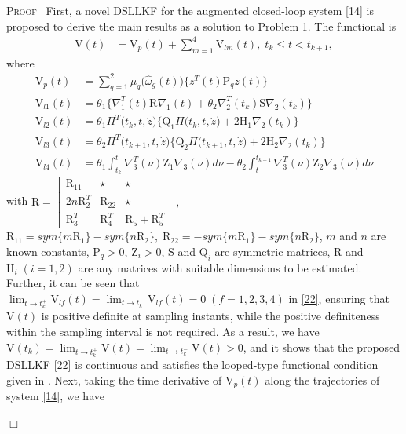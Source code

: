 \documentclass[preprint,11pt]{elsarticle}
\newenvironment{proof}{\noindent \textsc{Proof}\ }{\mbox{}\hfill $\Box$\\}
\begin{document}
\begin{proof}
First, a novel DSLLKF for the augmented closed-loop system \eqref{14} is proposed to derive the main results as a solution to Problem 1. The functional is
\begin{align}\label{22}
\mathrm{V}(t)&=\mathrm{V}_p(t)+\sum^4_{m=1}\mathrm{V}_{lm}(t),\;t_k\leq t<t_{k+1},
\end{align}
where\vspace{-0.3cm}
\begin{align*}
\mathrm{V}_p(t)&=\sum^{2}_{q=1}\mu_q\big( \hat{\omega}_g(t) \big)\big\{z^T(t)\mathrm{P}_qz(t)\big\}\\
\mathrm{V}_{l1}(t)&=\theta_1\Big\{\nabla^T_1(t)\mathrm{R}\nabla_1(t)+\theta_2\nabla^T_2(t_k)\mathrm{S}\nabla_2(t_k)\Big\}\\
\mathrm{V}_{l2}(t)&=\theta_1\Pi^T\big(t_k,t,\dot{z}\big)\Big\{ \mathrm{Q}_1\Pi\big(t_k,t,\dot{z}\big)+2\mathrm{H}_1 \nabla_2(t_k)\Big\}\\
\mathrm{V}_{l3}(t)&=\theta_2\Pi^T\big(t_{k+1},t,\dot{z}\big)\Big\{ \mathrm{Q}_2\Pi\big(t_{k+1},t,\dot{z}\big)+2\mathrm{H}_2 \nabla_2(t_k)\Big\}\\
\mathrm{V}_{l4}(t)&=\theta_1\int^t_{t_k}\nabla^T_3(\nu)\mathrm{Z}_1\nabla_3(\nu)d\nu
-\theta_2\int^{t_{k+1}}_{t}\nabla^T_3(\nu)\mathrm{Z}_2\nabla_3(\nu)d\nu
\end{align*}
with
$\mathrm{R}=
\begin{bmatrix}
\mathrm{R}_{11}  &   \star&  \star\\
2n\mathrm{R}^T_{2}& \mathrm{R}_{22} &  \star\\
\mathrm{R}^T_{3} & \mathrm{R}^T_{4}& \mathrm{R}_{5}+\mathrm{R}^T_{5}
\end{bmatrix},$
$\mathrm{R}_{11}=sym\{m\mathrm{R}_1\}-sym\{n\mathrm{R}_2\},\;
\mathrm{R}_{22}=-sym\{m\mathrm{R}_1\}-sym\{n\mathrm{R}_2\}$, $m$ and $n$ are known constants, $\mathrm{P}_q>0$, $\mathrm{Z}_i>0$, $\mathrm{S}$ and $\mathrm{Q}_i$ are symmetric matrices, $\mathrm{R}$ and $\mathrm{H}_i\;(i=1,2)$ are any matrices with suitable dimensions to be estimated. Further, it can be seen that  $\lim_{t\rightarrow t^+_k}\mathrm{V}_{lf}(t)=\lim_{t\rightarrow t^-_k}\mathrm{V}_{lf}(t)=0\;(f=1,2,3,4)$ in \eqref{22}, {ensuring that $\mathrm{V}(t)$ is positive definite at sampling
instants, while the positive definiteness within the sampling interval is not required.} As a result, we have $\mathrm{V}(t_k)=\lim_{t\rightarrow t^+_k}\mathrm{V}(t)=\lim_{t\rightarrow t^-_k}\mathrm{V}(t)>0$, {and it shows that the proposed DSLLKF \eqref{22} is continuous and satisfies the looped-type functional condition given in \cite{LP-1,LP-2,LP-3}.} Next, taking the time derivative of $\mathrm{V}_p(t)$ along the trajectories of system \eqref{14}, we have

\end{proof}
\end{document}
